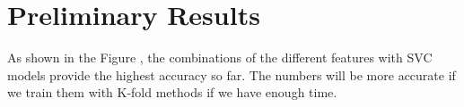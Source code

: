\section{Preliminary Results}


As shown in the Figure , the combinations of the different features with SVC models provide the highest accuracy so far. The numbers will be more accurate if we train them with K-fold methods if we have enough time.
